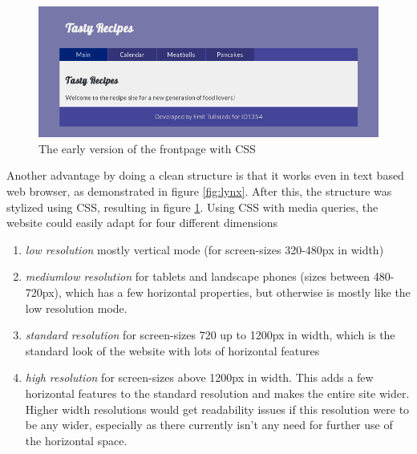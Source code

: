 \documentclass[a4paper]{scrartcl}
\begin{document}
\begin{figure}[!h]
  \begin{center}
    \includegraphics[scale=0.4]{frontpage1.png}
    \caption{The early version of the frontpage with CSS}
    \label{fig:early frontpage}
  \end{center}
\end{figure}

Another advantage by doing a clean structure is that it works even in text based web browser, as demonstrated in figure \ref{fig:lynx}. After this, the structure was stylized using CSS, resulting in figure \ref{fig:early frontpage}. Using CSS with media queries, the website could easily adapt for four different dimensions 
\begin{enumerate}
\item \textit{low resolution} mostly vertical mode (for screen-sizes 320-480px in width)
\item \textit{mediumlow resolution} for tablets and landscape phones (sizes between 480-720px), which has a few horizontal properties, but otherwise is mostly like the low resolution mode.
\item \textit{standard resolution} for screen-sizes 720 up to 1200px in width, which is the standard look of the website with lots of horizontal features
\item \textit{high resolution} for screen-sizes above 1200px in width. This adds a few horizontal features to the standard resolution and makes the entire site wider. Higher width resolutions would get readability issues if this resolution were to be any wider, especially as there currently isn't any need for further use of the horizontal space.
\end{enumerate}
\end{document}

